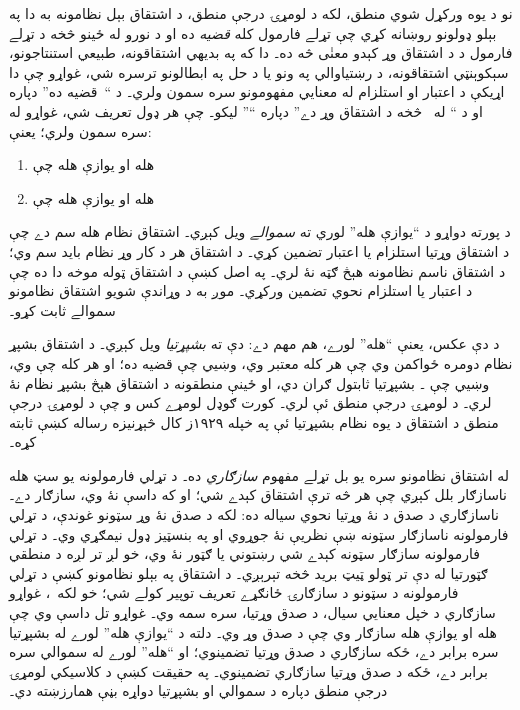 \documentclass[12pt,a4paper,oneside]{report}
\theoremstyle{definition}
\begin{document}
\label{olpseg:OLP-0064-B009:start}
نو د يوه ورکړل شوي منطق، لکه د لومړۍ درجې منطق، د اشتقاق
بېل نظامونه به دا په بېلو ډولونو روښانه کړي چې تړلے فارمول کله
\emph{قضيه} ده او د نورو له ځينو څخه د تړلے فارمول د
د اشتقاق وړ کېدو معنٰی څه ده۔ دا که په بديهي اشتقاقونه،
طبيعي استنتاجونو، سېکوېنټي اشتقاقونه، د رښتياوالي په ونو يا د
حل په ابطالونو ترسره شي، غواړو چې دا اړيکې د اعتبار او استلزام له
معنايي مفهومونو سره سمون ولري۔ د ``~قضيه ده'' دپاره
 او د `` له~\LR{$\Gamma$} څخه د اشتقاق وړ دے'' دپاره
``'' ليکو۔ \LR{$\Proves$} چې هر ډول تعريف شي، غواړو
له \LR{$\Entails$} سره سمون ولري؛ يعنې:
\begin{enumerate}
\item {} هله او يوازې هله چې 
\item {} هله او يوازې هله چې 
\end{enumerate}
د پورته دواړو د ``يوازې هله'' لوري ته \emph{سموالے} ويل کېږي۔
اشتقاق نظام هله سم دے چې د اشتقاق وړتيا استلزام يا اعتبار
تضمين کړي۔ د اشتقاق هر د کار وړ نظام بايد سم وي؛ د
اشتقاق ناسم نظامونه هېڅ ګټه نۀ لري۔ په اصل کښې د
اشتقاق ټوله موخه دا ده چې د اعتبار يا استلزام نحوي تضمين
ورکړي۔ موږ به د وړاندې شويو اشتقاق نظامونو سموالے ثابت کړو۔
\label{olpseg:OLP-0064-B009:end}

\label{olpseg:OLP-0064-B010:start}
د دې عکس، يعنې ``هله'' لورے، هم مهم دے: دې ته \emph{بشپړتيا} ويل
کېږي۔ د اشتقاق بشپړ نظام دومره ځواکمن وي چې هر کله 
معتبر وي، وښيي چې  قضيه ده؛ او هر کله چې
 وي، وښيي چې ۔ بشپړتيا ثابتول
ګران دي، او ځينې منطقونه د اشتقاق هېڅ بشپړ نظام نۀ لري۔ د
لومړۍ درجې منطق ئې لري۔ کورت ګوډل لومړے کس و چې د لومړۍ درجې منطق د
اشتقاق د يوه نظام بشپړتيا ئې په خپله ۱۹۲۹ز کال څېړنيزه
رساله کښې ثابته کړه۔
\label{olpseg:OLP-0064-B010:end}

\label{olpseg:OLP-0064-B011:start}
له اشتقاق نظامونو سره يو بل تړلے مفهوم \emph{سازګاري} ده۔
د تړلي فارمولونه يو سټ هله ناسازګار بلل کېږي چې هر څه ترې
اشتقاق کېدے شي؛ او که داسې نۀ وي، سازګار دے۔ ناسازګاري د صدق
د نۀ وړتيا نحوي سياله ده: لکه د صدق نۀ وړ سټونو غوندې، د
تړلي فارمولونه ناسازګار سټونه ښې نظريې نۀ جوړوي او په بنسټيز ډول
نيمګړي وي۔ د تړلي فارمولونه سازګار سټونه کېدے شي رښتوني يا ګټور نۀ
وي، خو لږ تر لږه د منطقي ګټورتيا له دې تر ټولو ټيټ بريد څخه تېرېږي۔
د اشتقاق په بېلو نظامونو کښې د تړلي فارمولونه د سټونو د
سازګارۍ ځانګړے تعريف توپير کولے شي؛ خو لکه~\LR{$\Proves$}، غواړو
سازګاري د خپل معنايي سيال، د صدق وړتيا، سره سمه وي۔ غواړو تل داسې
وي چې \LR{$\Gamma$} هله او يوازې هله سازګار وي چې د صدق وړ وي۔ دلته د
``يوازې هله'' لورے له بشپړتيا سره برابر دے، ځکه سازګاري د صدق
وړتيا تضمينوي؛ او ``هله'' لورے له سموالي سره برابر دے، ځکه د صدق
وړتيا سازګاري تضمينوي۔ په حقيقت کښې د کلاسيکي لومړۍ درجې منطق
دپاره د سموالي او بشپړتيا دواړه بڼې همارزښته دي۔
\label{olpseg:OLP-0064-B011:end}
\end{document}

